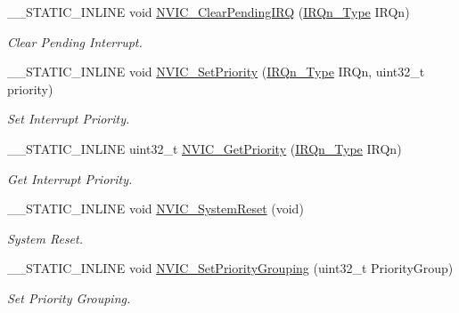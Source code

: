 \begin{DoxyCompactItemize}
\+\_\+\+\_\+\+S\+T\+A\+T\+I\+C\+\_\+\+I\+N\+L\+I\+NE void \mbox{\hyperlink{group___c_m_s_i_s___core___n_v_i_c_functions_ga332e10ef9605dc6eb10b9e14511930f8}{N\+V\+I\+C\+\_\+\+Clear\+Pending\+I\+RQ}} (\mbox{\hyperlink{group___peripheral__interrupt__number__definition_ga7e1129cd8a196f4284d41db3e82ad5c8}{I\+R\+Qn\+\_\+\+Type}} I\+R\+Qn)
\begin{DoxyCompactList}\small\item\em Clear Pending Interrupt. \end{DoxyCompactList}\item 
\+\_\+\+\_\+\+S\+T\+A\+T\+I\+C\+\_\+\+I\+N\+L\+I\+NE void \mbox{\hyperlink{group___c_m_s_i_s___core___n_v_i_c_functions_ga2305cbd44aaad792e3a4e538bdaf14f9}{N\+V\+I\+C\+\_\+\+Set\+Priority}} (\mbox{\hyperlink{group___peripheral__interrupt__number__definition_ga7e1129cd8a196f4284d41db3e82ad5c8}{I\+R\+Qn\+\_\+\+Type}} I\+R\+Qn, uint32\+\_\+t priority)
\begin{DoxyCompactList}\small\item\em Set Interrupt Priority. \end{DoxyCompactList}\item 
\+\_\+\+\_\+\+S\+T\+A\+T\+I\+C\+\_\+\+I\+N\+L\+I\+NE uint32\+\_\+t \mbox{\hyperlink{group___c_m_s_i_s___core___n_v_i_c_functions_ga1cbaf8e6abd4aa4885828e7f24fcfeb4}{N\+V\+I\+C\+\_\+\+Get\+Priority}} (\mbox{\hyperlink{group___peripheral__interrupt__number__definition_ga7e1129cd8a196f4284d41db3e82ad5c8}{I\+R\+Qn\+\_\+\+Type}} I\+R\+Qn)
\begin{DoxyCompactList}\small\item\em Get Interrupt Priority. \end{DoxyCompactList}\item 
\+\_\+\+\_\+\+S\+T\+A\+T\+I\+C\+\_\+\+I\+N\+L\+I\+NE void \mbox{\hyperlink{group___c_m_s_i_s___core___n_v_i_c_functions_ga1143dec48d60a3d6f238c4798a87759c}{N\+V\+I\+C\+\_\+\+System\+Reset}} (void)
\begin{DoxyCompactList}\small\item\em System Reset. \end{DoxyCompactList}\item 
\+\_\+\+\_\+\+S\+T\+A\+T\+I\+C\+\_\+\+I\+N\+L\+I\+NE void \mbox{\hyperlink{group___c_m_s_i_s___core___n_v_i_c_functions_ga77cfbb35a9d8027e392034321bed6904}{N\+V\+I\+C\+\_\+\+Set\+Priority\+Grouping}} (uint32\+\_\+t Priority\+Group)
\begin{DoxyCompactList}\small\item\em Set Priority Grouping. \end{DoxyCompactList}\item 

\end{DoxyCompactItemize}
